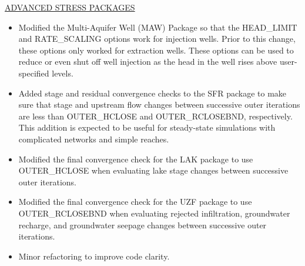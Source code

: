 	\underline{ADVANCED STRESS PACKAGES}
	\begin{itemize}
		\item Modified the Multi-Aquifer Well (MAW) Package so that the HEAD\_LIMIT and RATE\_SCALING options work for injection wells.  Prior to this change, these options only worked for extraction wells.  These options can be used to reduce or even shut off well injection as the head in the well rises above user-specified levels.
		\item Added stage and residual convergence checks to the SFR package to make sure that stage and upstream flow changes between successive outer iterations are less than OUTER\_HCLOSE and OUTER\_RCLOSEBND, respectively. This addition is expected to be useful for steady-state simulations with complicated networks and simple reaches.
		\item Modified the final convergence check for the LAK package to use OUTER\_HCLOSE when evaluating lake stage changes between successive outer iterations.
		\item Modified the final convergence check for the UZF package to use OUTER\_RCLOSEBND when evaluating rejected infiltration, groundwater recharge, and groundwater seepage changes between successive outer iterations.
		\item Minor refactoring to improve code clarity.
	\end{itemize}
	
